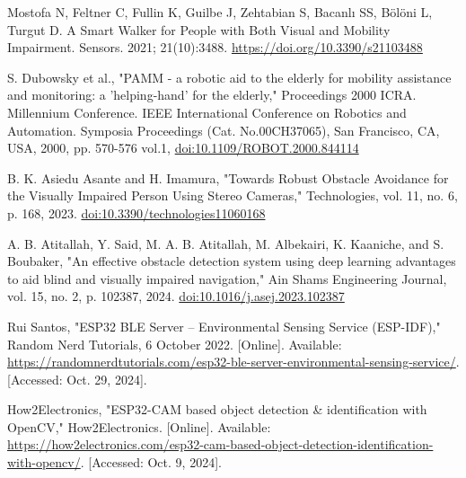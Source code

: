 \begin{thebibliography}{45}
	
	 Mostofa N, Feltner C, Fullin K, Guilbe J, Zehtabian S, Bacanlı SS, Bölöni L, Turgut D. A Smart Walker for People with Both Visual and Mobility Impairment. Sensors. 2021; 21(10):3488. \href{https://doi.org/10.3390/s21103488}{https://doi.org/10.3390/s21103488}
	
	 S. Dubowsky et al., "PAMM - a robotic aid to the elderly for mobility assistance and monitoring: a 'helping-hand' for the elderly," Proceedings 2000 ICRA. Millennium Conference. IEEE International Conference on Robotics and Automation. Symposia Proceedings (Cat. No.00CH37065), San Francisco, CA, USA, 2000, pp. 570-576 vol.1, \href{https://doi.org/10.1109/ROBOT.2000.844114}{doi:10.1109/ROBOT.2000.844114}
	
	 B. K. Asiedu Asante and H. Imamura, "Towards Robust Obstacle Avoidance for the Visually Impaired Person Using Stereo Cameras," Technologies, vol. 11, no. 6, p. 168, 2023. \href{https://doi.org/10.3390/technologies11060168}{doi:10.3390/technologies11060168}
	
	 A. B. Atitallah, Y. Said, M. A. B. Atitallah, M. Albekairi, K. Kaaniche, and S. Boubaker, "An effective obstacle detection system using deep learning advantages to aid blind and visually impaired navigation," Ain Shams Engineering Journal, vol. 15, no. 2, p. 102387, 2024. \href{https://doi.org/10.1016/j.asej.2023.102387}{doi:10.1016/j.asej.2023.102387}
	
	 Rui Santos, "ESP32 BLE Server – Environmental Sensing Service (ESP-IDF)," Random Nerd Tutorials, 6 October 2022. [Online]. Available: \href{https://randomnerdtutorials.com/esp32-ble-server-environmental-sensing-service/}{https://randomnerdtutorials.com/esp32-ble-server-environmental-sensing-service/}. [Accessed: Oct. 29, 2024].

	 How2Electronics, "ESP32-CAM based object detection \& identification with OpenCV," How2Electronics. [Online]. Available: \href{https://how2electronics.com/esp32-cam-based-object-detection-identification-with-opencv/}{https://how2electronics.com/esp32-cam-based-object-detection-identification-with-opencv/}. [Accessed: Oct. 9, 2024].
	

\end{thebibliography}
